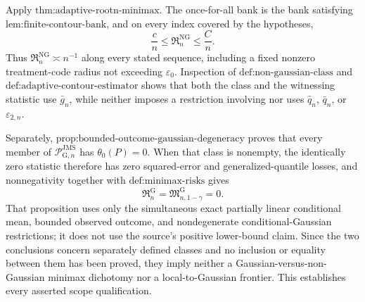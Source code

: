 Apply \(\text{thm:adaptive-rootn-minimax}\).  The once-for-all bank is the bank satisfying \(\text{lem:finite-contour-bank}\), and on every index covered by the hypotheses,
\[
 \frac cn\le\mathfrak R_n^{\mathrm{NG}}\le\frac Cn.
\]
Thus \(\mathfrak R_n^{\mathrm{NG}}\asymp n^{-1}\) along every stated sequence, including a fixed nonzero treatment-code radius not exceeding \(\varepsilon_0\).  Inspection of \(\text{def:non-gaussian-class}\) and \(\text{def:adaptive-contour-estimator}\) shows that both the class and the witnessing statistic use \(\bar g_n\), while neither imposes a restriction involving nor uses \(\widehat q_n\), \(\bar q_n\), or \(\varepsilon_{2,n}\).

Separately, \(\text{prop:bounded-outcome-gaussian-degeneracy}\) proves that every member of \(\mathcal P_{\mathrm G,n}^{\mathrm{JMS}}\) has \(\theta_0(P)=0\).  When that class is nonempty, the identically zero statistic therefore has zero squared-error and generalized-quantile losses, and nonnegativity together with \(\text{def:minimax-risks}\) gives
\[
 \mathfrak R_n^{\mathrm G}
 =\mathfrak M_{n,1-\gamma}^{\mathrm G}=0.
\]
That proposition uses only the simultaneous exact partially linear conditional mean, bounded observed outcome, and nondegenerate conditional-Gaussian restrictions; it does not use the source's positive lower-bound claim.  Since the two conclusions concern separately defined classes and no inclusion or equality between them has been proved, they imply neither a Gaussian-versus-non-Gaussian minimax dichotomy nor a local-to-Gaussian frontier.  This establishes every asserted scope qualification.